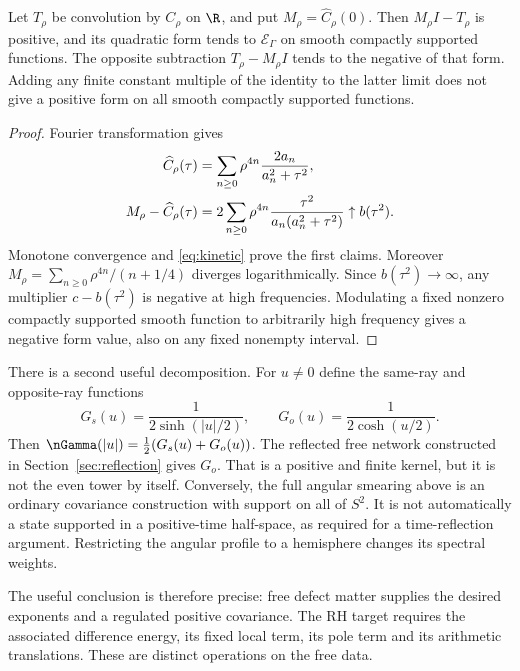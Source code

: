 \begin{proposition}\label{prop:subtraction}
Let $T_\rho$ be convolution by $C_\rho$ on $\R$, and put
$M_\rho=\widehat C_\rho(0)$. Then $M_\rho I-T_\rho$ is positive,
and its quadratic form tends to $\mathcal E_\Gamma$ on smooth compactly
supported functions. The opposite subtraction $T_\rho-M_\rho I$ tends
to the negative of that form. Adding any finite constant multiple of
the identity to the latter limit does not give a positive form on all
smooth compactly supported functions.
\end{proposition}
\begin{proof}
Fourier transformation gives
\begin{align}
 \widehat C_\rho(\tau)&=\sum_{n\geq0}\rho^{4n}
 \frac{2a_n}{a_n^2+\tau^2},\notag\\
 M_\rho-\widehat C_\rho(\tau)
 &=2\sum_{n\geq0}\rho^{4n}\frac{\tau^2}{a_n(a_n^2+\tau^2)}
 \uparrow b(\tau^2).
\end{align}
Monotone convergence and \eqref{eq:kinetic} prove the first claims.
Moreover $M_\rho=\sum_{n\geq0}\rho^{4n}/(n+1/4)$ diverges
logarithmically. Since $b(\tau^2)\to\infty$, any multiplier
$c-b(\tau^2)$ is negative at high frequencies. Modulating a fixed
nonzero compactly supported smooth function to arbitrarily high
frequency gives a negative form value, also on any fixed nonempty
interval.
\end{proof}

There is a second useful decomposition. For $u\ne0$ define the
same-ray and opposite-ray functions
\begin{equation}\label{eq:rays}
 G_s(u)=\frac1{2\sinh(|u|/2)},\qquad
 G_o(u)=\frac1{2\cosh(u/2)}.
\end{equation}
Then $\nGamma(|u|)=\tfrac12(G_s(u)+G_o(u))$. The reflected free
network constructed in Section~\ref{sec:reflection} gives $G_o$.
That is a positive and finite kernel, but it is not the even tower by
itself. Conversely, the full angular smearing above is an ordinary
covariance construction with support on all of $S^2$. It is not
automatically a state supported in a positive-time half-space, as
required for a time-reflection argument. Restricting the angular
profile to a hemisphere changes its spectral weights.

The useful conclusion is therefore precise: free defect matter
supplies the desired exponents and a regulated positive covariance.
The RH target requires the associated difference energy, its fixed
local term, its pole term and its arithmetic translations. These
are distinct operations on the free data.

